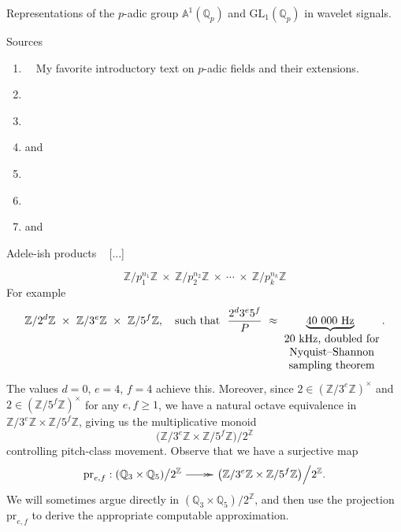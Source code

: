 \documentclass[letterpaper,11pt, reqno]{amsart}
\makeatletter
\newtheorem{monodromy theorem}{Monodromy Theorem}[subsection]
\newtheorem{wild conjecture}[theorem]{Wild Conjecture}
\newtheorem{research objectives}{Research objectives}[subsection]
\newtheorem{research question}[theorem]{Research questions}
\newtheorem{aside question}[theorem]{Aside question}
\newtheorem{audio example}[theorem]{\loudspeaker[3] Example}
\newtheorem{blank remark}[theorem]{}
\newtheorem{terminology and comment}[theorem]{Terminology and comment}
\newtheorem{purity hypothesis}[theorem]{Purity hypothesis}
\newtheorem{corollary of the purity hypothesis}[theorem]{Corollary of the purity hypothesis}
\newcommand{\QQ} {{\mathbb Q}}
\newcommand{\ZZ} {{\mathbb Z}}
\newcommand{\epi}{\!\xymatrix{{}\ar@{->>}[r]&{}}\!}
\numberwithin{equation}{theorem}
\makeatother
\begin{document}
\vskip 1cm

\begin{section}{Representations of the $p$-adic group $\mathbb{A}^{\!1}(\mathbb{Q}_{p})$
and $\text{GL}_{1}(\mathbb{Q}_{p})$
in wavelet signals.}



\begin{subsection}{Sources}
	\begin{enumerate}[{\bf\ \ \ \ \ \ 1.}]
	\item
	\cite[Chp. 4]{Guillot}\ \textemdash\ My favorite introductory text on $p$-adic fields and their extensions.
	\item
	\cite[Chp. XV: {\em J. T. Tate's thesis}, 1950]{CF}
	\item
	\cite[\S VII]{Lang}
	\item
	\cite[\S 1]{GHv1} and \cite{GHv2}
	\item
	\cite[\S 7.2.3]{Mallat}
	\item
	\cite[\S5.5]{SN}
	\item
	\cite{Kozyrev} and \cite{KozKhre}
	\end{enumerate}
\end{subsection}

\begin{subsection}{Adele-ish products}
\ 
{\color{red} [...]}

	$$
	\ZZ/p^{n_1}_{1}\ZZ
	\ \times\ 
	\ZZ/p^{n_2}_{2}\ZZ
	\ \times\ 
	\cdots
	\ \times\ 
	\ZZ/p^{n_{k}}_{k}\ZZ
	$$
For example
	$$
	\ZZ/2^{d}\ZZ
	\ \times\ 
	\ZZ/3^{e}\ZZ
	\ \times\ 
	\ZZ/5^{f}\ZZ,
	\ \ \ \text{such that}\ \ \frac{2^{d}3^{e}5^{f}}{P}
	\ \approx\!
	\underset{
	{\smaller\smaller\smaller\smaller
	\begin{array}{c}
	\text{20\ kHz, doubled for}
	\\
	\text{Nyquist–Shannon}
	\\
	\text{sampling theorem}
	\end{array}
	}\!\!
	}{\underbrace{40\ 000\ \text{Hz}}}.
	$$
The values $d=0$, $e=4$, $f=4$ achieve this. Moreover, since $2\in(\ZZ/3^{e}\ZZ)^{\times}$ and $2\in(\ZZ/5^{f}\ZZ)^{\times}$ for any $e,f\ge 1$, we have a natural octave equivalence in $\ZZ/3^e\ZZ\times\ZZ/5^f\ZZ$, giving us the multiplicative monoid
	$$
	\big(\ZZ/3^e\ZZ\times\ZZ/5^f\ZZ\big)\Big/2^{\ZZ}
	$$
controlling pitch-class movement. Observe that we have a surjective map
	$$
	\text{pr}_{e,f}:(\QQ_{3}\times\QQ_5)\big/2^{\ZZ}
	\epi
	\big(\ZZ/3^e\ZZ\times\ZZ/5^f\ZZ\big)\Big/2^{\ZZ}.
	$$
We will sometimes argue directly in $(\QQ_{3}\times\QQ_5)\big/2^{\ZZ}$, and then use the projection $\text{pr}_{e,f}$ to derive the appropriate computable approximation.


\end{subsection}
\end{section}
\end{document}
